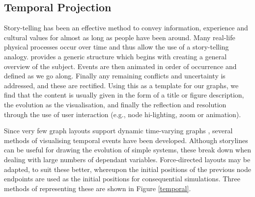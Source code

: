 \subsection{Temporal Projection}
Story-telling has been an effective method to convey information, experience and cultural values for almost as long as people have been around. Many real-life physical processes occur over time and thus allow the use of a story-telling analogy. \citep{storytelling} provides a generic structure which begins with creating a general overview of the subject. Events are then animated in order of occurrence and defined as we go along. Finally any remaining conflicts and uncertainty is addressed, and these are rectified.  
Using this as a template for our graphs, we find that the content is usually given in the form of a title or figure description, the evolution as the visualisation, and finally the reflection and resolution through the use of user interaction (e.g., node hi-lighting, zoom or animation).

Since very few graph layouts support dynamic time-varying graphs \citep{tvg}, several methods of visualising temporal events have been developed. 
Although storylines can be useful for drawing the evolution of simple systems, these break down when dealing with large numbers of dependant variables. Force-directed layouts may be adapted, to suit these better, whereupon the initial positions of the previous node endpoints are used as the initial positions for consequential simulations. Three methods of representing these are shown in Figure \ref{temporal}.


